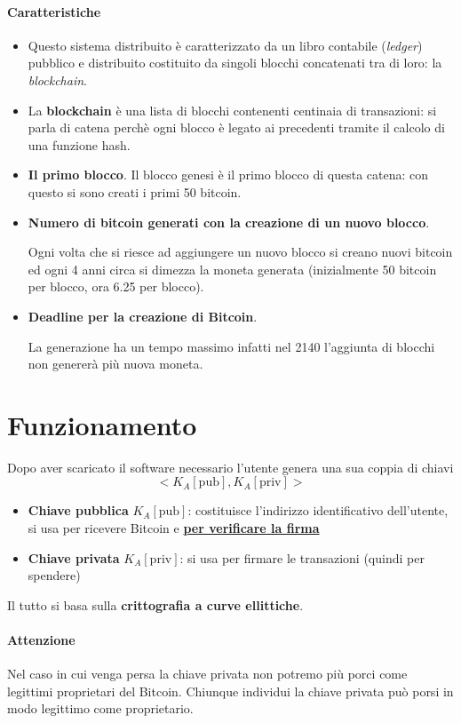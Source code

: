 \paragraph{Caratteristiche} 
\begin{itemize}
	\item Questo sistema distribuito è caratterizzato da un libro contabile (\emph{ledger}) pubblico e distribuito costituito da singoli blocchi concatenati tra di loro: la \emph{blockchain}.
	\item La \textbf{blockchain} è una lista di blocchi contenenti centinaia di transazioni: si parla di catena perchè ogni blocco è legato ai precedenti tramite il calcolo di una funzione hash. 
	\item \textbf{Il primo blocco}. Il blocco genesi è il primo blocco di questa catena: con questo si sono creati i primi 50 bitcoin.
	\item \textbf{Numero di bitcoin generati con la creazione di un nuovo blocco}.
	
	Ogni volta che si riesce ad aggiungere un nuovo blocco si creano nuovi bitcoin ed ogni 4 anni circa si dimezza la moneta generata (inizialmente 50 bitcoin per blocco, ora 6.25 per blocco).
	\item \textbf{Deadline per la creazione di Bitcoin}. 
	
	La generazione ha un tempo massimo infatti nel 2140 l'aggiunta di blocchi non genererà più nuova moneta.
\end{itemize}

\section{Funzionamento}
Dopo aver scaricato il software necessario l'utente genera una sua coppia di chiavi
$$<K_A[\text{pub}], K_A[\text{priv}]>$$
\begin{itemize}
    \item \textbf{Chiave pubblica} $K_A[\text{pub}]$: costituisce l'indirizzo identificativo dell'utente, si usa per ricevere Bitcoin e \textbf{\underline{per verificare la firma}}
    \item \textbf{Chiave privata} $K_A[\text{priv}]$: si usa per firmare le transazioni (quindi per spendere)
\end{itemize}
Il tutto si basa sulla \textbf{crittografia a curve ellittiche}. 

\paragraph{Attenzione} Nel caso in cui venga persa la chiave privata non potremo più porci come legittimi proprietari del Bitcoin. Chiunque individui la chiave privata può porsi in modo legittimo come proprietario.

